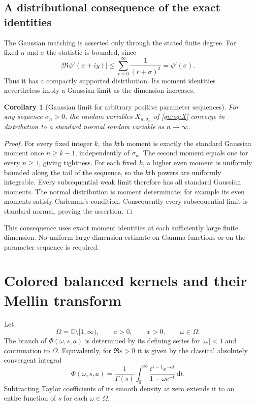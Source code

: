 \documentclass[11pt,a4paper]{article}
\numberwithin{equation}{section}
\newtheorem{corollary}[theorem]{Corollary}
\theoremstyle{definition}
\theoremstyle{remark}
\newcommand{\dd}{\,\mathrm d}
\newcommand{\C}{\mathbb C}
\begin{document}
\subsection{A distributional consequence of the exact identities}

The Gaussian matching is asserted only through the stated finite degree.
For fixed $n$ and $\sigma$ the statistic is bounded, since
\[
 |\Re\psi'(\sigma+iy)|\le\sum_{r=0}^\infty\frac1{(r+\sigma)^2}
                       =\psi'(\sigma).
\]
Thus it has a compactly supported distribution.  Its moment identities
nevertheless imply a Gaussian limit as the dimension increases.

\begin{corollary}[Gaussian limit for arbitrary positive parameter sequences]
\label{gn:cor:CLT}
For any sequence $\sigma_n>0$, the random variables
$X_{n,\sigma_n}$ of \eqref{gn:eq:X} converge in distribution to a
standard normal random variable as $n\to\infty$.
\end{corollary}

\begin{proof}
For every fixed integer $k$, the $k$th moment is exactly the standard
Gaussian moment once $n\ge k-1$, independently of $\sigma_n$.
The second moment equals one for every $n\ge1$, giving tightness.
For each fixed $k$, a higher even moment is uniformly bounded along
the tail of the sequence, so the $k$th powers are uniformly integrable.
Every subsequential weak limit therefore has all standard Gaussian
moments.  The normal distribution is moment determinate; for example
its even moments satisfy Carleman's condition.  Consequently every
subsequential limit is standard normal, proving the assertion.
\end{proof}

This consequence uses exact moment identities at each sufficiently
large finite dimension.  No uniform large-dimension estimate on Gamma
functions or on the parameter sequence is required.


\section{Colored balanced kernels and their Mellin transform}
\label{sec:colored}

Let
\[
 \Omega=\C\setminus[1,\infty),\qquad a>0,\qquad x>0,\qquad \omega\in\Omega.
\]
The branch of $\Phi(\omega,s,a)$ is determined by its defining series
for $|\omega|<1$ and continuation to $\Omega$. Equivalently, for
$\Re s>0$ it is given by the classical absolutely convergent integral
\cite[25.14.5]{dlmflerch}
\begin{equation}\label{col:lerch-integral}
 \Phi(\omega,s,a)=\frac1{\Gamma(s)}
  \int_0^\infty\frac{t^{s-1}e^{-at}}{1-\omega e^{-t}}\dd t.
\end{equation}
Subtracting Taylor coefficients of its smooth density at zero extends
it to an entire function of $s$ for each $\omega\in\Omega$.
\end{document}
